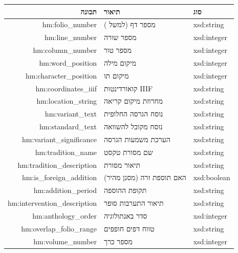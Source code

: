 \documentclass[12pt,a4paper]{article}
\newcommand{\en}[1]{\textenglish{\LR{#1}}}
\newcommand{\new}[1]{\textcolor{newaddition}{#1}}
\newcommand{\newprop}[1]{\textcolor{newaddition}{#1}}
\begin{document}
\begin{longtable}{|r|p{5cm}|p{3cm}|}
\hline
\textbf{תכונה} & \textbf{תיאור} & \textbf{סוג} \\
\hline
\endhead

\newprop{hm:folio\_number} & \new{מספר דף (למשל \en{15r})} & \new{xsd:string}\\
\hline
\newprop{hm:line\_number} & \new{מספר שורה} & \new{xsd:integer}\\
\hline
\newprop{hm:column\_number} & \new{מספר טור} & \new{xsd:integer}\\
\hline
\newprop{hm:word\_position} & \new{מיקום מילה} & \new{xsd:integer}\\
\hline
\newprop{hm:character\_position} & \new{מיקום תו} & \new{xsd:integer}\\
\hline
\newprop{hm:coordinates\_iiif} & \new{קואורדינטות IIIF} & \new{xsd:string}\\
\hline

\newprop{hm:location\_string} & \new{מחרוזת מיקום קריאה} & \new{xsd:string}\\
\hline

\newprop{hm:variant\_text} & \new{נוסח הגרסה החלופית} & \new{xsd:string}\\
\hline

\newprop{hm:standard\_text} & \new{נוסח מקובל להשוואה} & \new{xsd:string}\\
\hline

\newprop{hm:variant\_significance} & \new{הערכת משמעות הגרסה} & \new{xsd:string}\\
\hline

\newprop{hm:tradition\_name} & \new{שם מסורת טקסט} & \new{xsd:string}\\
\hline

\newprop{hm:tradition\_description} & \new{תיאור מסורת} & \new{xsd:string}\\
\hline

\newprop{hm:is\_foreign\_addition} & \new{האם תוספת זרה (מסנן מהיר)} & \new{xsd:boolean}\\
\hline

\newprop{hm:addition\_period} & \new{תקופת ההוספה} & \new{xsd:string}\\
\hline

\newprop{hm:intervention\_description} & \new{תיאור התערבות סופר} & \new{xsd:string}\\
\hline

\newprop{hm:anthology\_order} & \new{סדר באנתולוגיה} & \new{xsd:integer}\\
\hline

\newprop{hm:overlap\_folio\_range} & \new{טווח דפים חופפים} & \new{xsd:string}\\
\hline

\newprop{hm:volume\_number} & \new{מספר כרך} & \new{xsd:integer}\\
\hline
\end{longtable}
\end{document}
